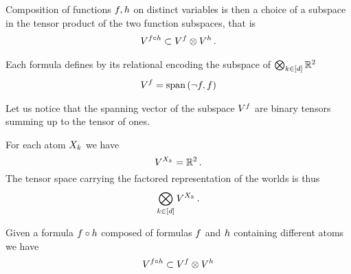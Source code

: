 Composition of functions $f,h$ on distinct variables is then a choice of a subspace in the tensor product of the two function subspaces, that is
\begin{align}
	V^{f\circ h} 
	\subset V^{f} \otimes V^{h} \, . 
\end{align}







Each formula defines by its relational encoding the subspace of $\bigotimes_{k\in[d]}\mathbb{R}^2$
\begin{align}
	\subspaceof{\exformula} = \spanof{\lnot\exformula,\exformula} %
\end{align}

Let us notice that the spanning vector of the subspace $V^{f}$ are binary tensors summing up to the tensor of ones.


For each atom $X_{k}$ we have
	\[ V^{X_{k}} = \mathbb{R}^2 \, . \]
The tensor space carrying the factored representation of the worlds is thus
\begin{align}
	\bigotimes_{k\in[d]}V^{X_{k}} \, .
\end{align}


Given a formula $f\circ h$ composed of formulas $f$ and $h$ containing different atoms we have
\begin{align}
	V^{f\circ h} 
	\subset V^{f} \otimes V^{h}
\end{align}

